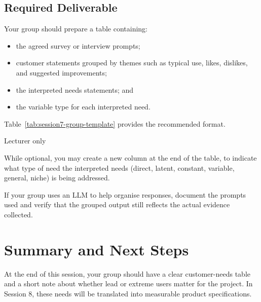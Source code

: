 \subsection{Required Deliverable}

Your group should prepare a table containing:
\begin{itemize}
    \item the agreed survey or interview prompts;
    \item customer statements grouped by themes such as typical use, likes, dislikes, and suggested improvements;
    \item the interpreted needs statements; and
    \item the variable type for each interpreted need.
\end{itemize}

Table~\ref{tab:session7-group-template} provides the recommended format.





Lecturer only


While optional, you may create a new column at the end of the table, to indicate what type of need the interpreted needs (direct, latent, constant, variable, general, niche) is being addressed.


If your group uses an LLM to help organise responses, document the prompts used and verify that the grouped output still reflects the actual evidence collected.

\section{Summary and Next Steps}

At the end of this session, your group should have a clear customer-needs table and a short note about whether lead or extreme users matter for the project. In Session 8, these needs will be translated into measurable product specifications.
